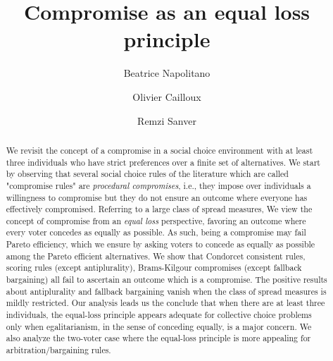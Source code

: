 \documentclass[version=3.21, pagesize, twoside=off, bibliography=totoc, DIV=calc, fontsize=12pt, a4paper]{scrartcl}
\title{Compromise as an equal loss principle}
\author{Beatrice Napolitano}
\author{Olivier Cailloux}
\author{Remzi Sanver}
\affil{Université Paris-Dauphine, PSL Research University, CNRS, LAMSADE, 75016 PARIS, FRANCE\\
	\href{mailto:@dauphine.fr}{@dauphine.fr}
}
\begin{document}
\maketitle

\begin{abstract}
	We revisit the concept of a compromise in a social choice environment with at least three individuals who have strict preferences over a finite set of alternatives. We start by observing that several social choice rules of the literature which are called "compromise rules" are \emph{procedural compromises}, i.e., they impose over individuals a willingness to compromise but they do not ensure an outcome where everyone has effectively compromised. Referring to a large class of spread measures, We view the concept of compromise from an \emph{equal loss} perspective, favoring an outcome where every voter concedes as equally as possible. As such, being a compromise may fail Pareto efficiency, which we ensure by asking voters to concede as equally as possible among the Pareto efficient alternatives. We show that Condorcet consistent rules, scoring rules (except antiplurality), Brams-Kilgour compromises (except fallback bargaining) all fail to ascertain an outcome which is a compromise. The positive results about antiplurality and fallback bargaining vanish when the class of spread measures is mildly restricted. Our analysis leads us the conclude that when there are at least three individuals, the equal-loss principle appears adequate for collective choice problems only when egalitarianism, in the sense of conceding equally, is a major concern. We also analyze the two-voter case where the equal-loss principle is more appealing for arbitration/bargaining rules.
\end{abstract}
\end{document}
